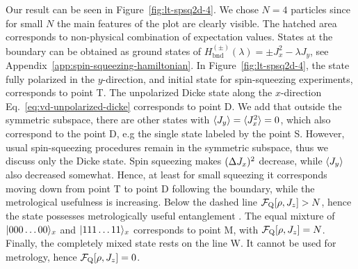 Our result can be seen in Figure~\ref{fig:lt-spsq2d-4}.
We chose $N=4$ particles since for small $N$ the main features of the plot are clearly visible.
The hatched area corresponds to non-physical combination of expectation values.
States at the boundary can be obtained as ground states of $H_{\text{bnd}}^{(\pm)}(\lambda)=\pm J_x^2 -\lambda J_y$, see Appendix~\ref{app:spin-squeezing-hamiltonian}.
In Figure~\ref{fig:lt-spsq2d-4}, the state fully polarized in the $y$-direction, and initial state for spin-squeezing experiments, corresponds to point T.
The unpolarized Dicke state along the $x$-direction Eq.~\eqref{eq:vd-unpolarized-dicke} corresponds to point D.
We add that outside the symmetric subspace, there are other states with $\langle{J_y}\rangle=\langle{J_x^2}\rangle=0$, which also correspond to the point D, e.g the single state labeled by the point S.
However, usual spin-squeezing procedures remain in the symmetric subspace, thus we discuss only the Dicke state.
Spin squeezing makes $(\Delta J_x )^2$ decrease, while $\langle{J_y}\rangle$ also decreased somewhat.
Hence, at least for small squeezing it corresponds moving down from point T to point D following the boundary, while the metrological usefulness is increasing.
Below the dashed line $\mathcal{F}_{\textnormal{Q}}[{\textstyle \rho,J_z}]>N$, hence the state possesses metrologically useful entanglement \cite{LT3}.
The equal mixture of $\vert{000\dots00}\rangle_x$ and $\vert{111\dots11}\rangle_x$ corresponds to point M, with $\mathcal{F}_{\textnormal{Q}}[{\textstyle \rho,J_z}] = N$.
Finally, the completely mixed state rests on the line W.
It cannot be used for metrology, hence $\mathcal{F}_{\textnormal{Q}}[{\textstyle \rho,J_z}]=0$.
